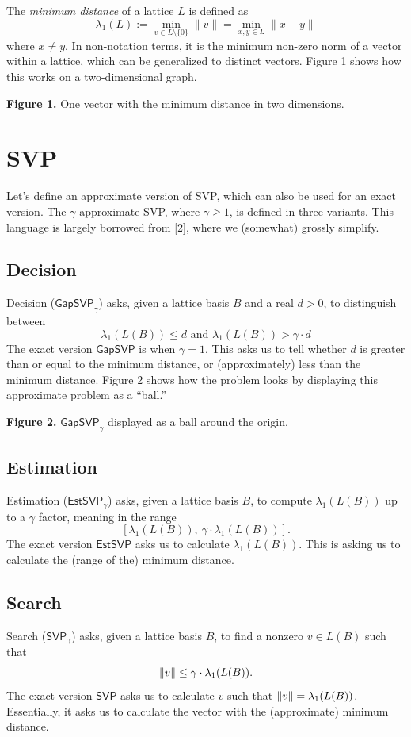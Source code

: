 \documentclass{article}
\begin{document}
The \emph{minimum distance} of a lattice $L$ is defined as
\[
\lambda_1(L)
:=
\min_{v \in L \setminus \{0\}} \lVert v \rVert
=
\min_{x,y \in L}
\lVert x-y \rVert
\]
where $x \neq y$.
In non-notation terms, it is the minimum non-zero norm of a vector within a lattice, which can be generalized to distinct vectors.
Figure 1 shows how this works on a two-dimensional graph.

{\textbf{Figure 1.} One vector with the minimum distance in two dimensions.}

\section{SVP}
Let's define an approximate version of SVP, which can also be used for an exact version.
The $\gamma$-approximate SVP, where $\gamma \geq 1$, is defined in three variants.
This language is largely borrowed from [2], where we (somewhat) grossly simplify.


\subsection{Decision}
Decision ($\mathsf{GapSVP}_\gamma$) asks, given a lattice basis $B$ and a real $d > 0$, to distinguish between 
\[
\lambda_1 (L(B)) \leq d \text{ and } \lambda_1 (L(B)) > \gamma \cdot d
\]
The exact version $\mathsf{GapSVP}$ is when $\gamma = 1$.
This asks us to tell whether $d$ is greater than or equal to the minimum distance, or (approximately) less than the minimum distance.
Figure 2 shows how the problem looks by displaying this approximate problem as a ``ball.''

{\textbf{Figure 2.} $\mathsf{GapSVP}_\gamma$ displayed as a ball around the origin.}

\subsection{Estimation}
Estimation ($\mathsf{EstSVP}_\gamma$) asks, given a lattice basis $B$, to compute $\lambda_1 (L(B))$ up to a $\gamma$ factor, meaning in the range 
\[
[\lambda_1 (L(B)),\ \gamma \cdot \lambda_1 (L(B))].
\]
The exact version $\mathsf{EstSVP}$ asks us to calculate $\lambda_1 (L(B))$.
This is asking us to calculate the (range of the) minimum distance.

\subsection{Search}
Search ($\mathsf{SVP}_\gamma$) asks, given a lattice basis $B$, to find a nonzero $v \in L(B)$ such that 
\[
\lVert v \rVert \leq \gamma \cdot \lambda_1 (L(B)).
\]
The exact version $\mathsf{SVP}$ asks us to calculate $v$ such that $\lVert v \rVert = \lambda_1(L(B))$.
Essentially, it asks us to calculate the vector with the (approximate) minimum distance.
\end{document}
